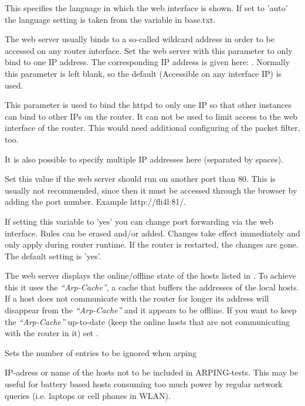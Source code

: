 \begin{description}


    {This specifies the language in which the web interface is shown. 
    If set to 'auto' the language setting is taken from the variable
     in base.txt.}


The web server usually binds to a so-called wildcard address 
in order to be accessed on any router interface. Set the web server 
with this parameter to only bind to one IP address. The corresponding 
IP address is given here: . Normally
this parameter is left blank, so the default (Accessible on any 
interface IP) is used.

This parameter is used to bind the httpd to only one IP so that other 
instances can bind to other IPs on the router. It can not be used 
to limit access to the web interface of the router. This would need 
additional configuring of the packet filter, too.

It is also possible to specify multiple IP addresses here (separated 
by spaces).


    {Set this value if the web server should run on another port than 
    80. This is usually not recommended, since then it must be 
    accessed through the browser by adding the port number. Example 
    http://fli4l:81/.}

 {If setting this
  variable to 'yes' you can change port forwarding via the web 
  interface. Rules can be erased and/or added. Changes take effect 
  immediately and only apply during router runtime. If the router is 
  restarted, the changes are gone. The default setting is 'yes'.}

 {The web server displays
  the online/offline state of the hosts listed in . To achieve 
  this it uses the \emph{``Arp-Cache''}, a cache that buffers the addresses 
  of the local hosts. If a host does not communicate with the router for 
  longer its address will disappear from the \emph{``Arp-Cache''} and it 
  appears to be offline. If you want to keep the \emph{``Arp-Cache''} up-to-date 
  (keep the online hosts that are not communicating with the router in it) 
  set .}

  {Sets the number of entries to be ignored when arping}
  
  {IP-adress or name of the hosts not to be included in ARPING-tests.
  This may be useful for battery based hosts consuming too much power by 
  regular network queries (i.e. laptops or cell phones in WLAN).}
  
\end{description}

